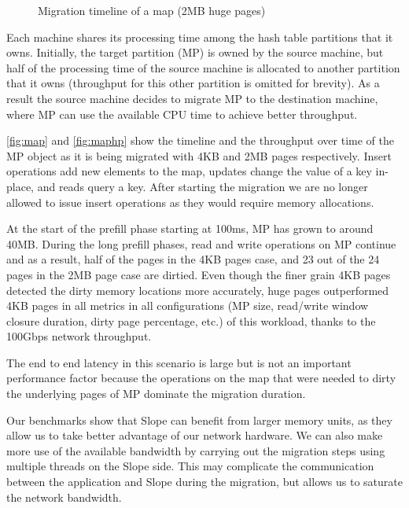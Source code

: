 \begin{figure}[tp]
    \begin{center}
        
    \end{center}
    \caption{Migration timeline of a map (2MB huge pages)}
    \label{fig:maphp}
\end{figure}


Each machine shares its processing time among the hash table partitions that
it owns. Initially, the target partition (MP) is owned by the source machine, but half of
the processing time of the source machine is allocated to another partition that
it owns (throughput for this other partition is omitted for brevity). As a result
the source machine decides to migrate MP to the destination machine, where MP
can use the available CPU time to achieve better throughput.

\autoref{fig:map} and \autoref{fig:maphp} show the timeline and the throughput
over time of the MP object as it is being migrated with 4KB and 2MB pages
respectively. Insert operations add new elements to the map, updates change
the value of a key in-place, and reads query a key. After starting the migration
we are no longer allowed to issue insert operations as they would require
memory allocations.

At the start of the prefill phase starting at 100ms, MP has grown to around 40MB.
During the long prefill phases, read and write operations on MP continue and as
a result, half of the pages in the 4KB pages case, and 23 out of the 24 pages in the
2MB page case are dirtied. Even though the finer grain 4KB pages detected the
dirty memory locations more accurately, huge pages outperformed 4KB pages in all
metrics in all configurations (MP size, read/write window closure duration,
dirty page percentage, etc.) of this workload, thanks to the 100Gbps network
throughput.

The end to end latency in this scenario is large but is not an important
performance factor because the operations
on the map that were needed to dirty the underlying pages of MP dominate
the migration duration.

Our benchmarks show that Slope can benefit from larger memory units, as they
allow us to take better advantage of our network hardware. We can also make
more use of the available bandwidth by carrying out the migration steps using
multiple threads on the Slope side. This may complicate the communication
between the application and Slope during the migration, but allows us to
saturate the network bandwidth.

